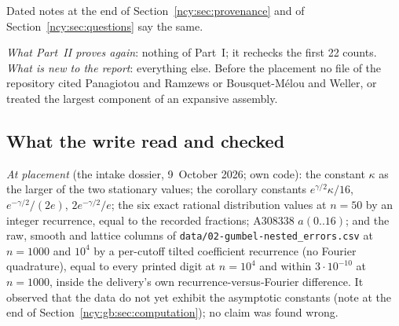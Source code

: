 \documentclass[11pt,letterpaper]{article}
\numberwithin{equation}{section}
\theoremstyle{remark}\newtheorem{remark}[theorem]{Remark}
\newcommand{\file}[1]{\nolinkurl{#1}}
\theoremstyle{definition}\newtheorem{definition}[theorem]{Definition}\theoremstyle{plain}
\begin{document}
Dated notes at the end of Section~\ref{ncy:sec:provenance} and of
Section~\ref{ncy:sec:questions} say the same.

\emph{What Part~II proves again}: nothing of Part~I; it rechecks the first 22
counts. \emph{What is new to the report}: everything else. Before the
placement no file of the repository cited Panagiotou and Ramzews or
Bousquet-M\'elou and Weller, or treated the largest component of an
expansive assembly.

\subsection{What the write read and checked}\label{ncy:gb:sec:checks}

\emph{At placement} (the intake dossier, 9~October 2026; own code): the
constant $\kappa$ as the larger of the two stationary values; the corollary
constants $e^{\gamma/2}\kappa/16$, $e^{-\gamma/2}/(2e)$, $2e^{-\gamma/2}/e$;
the six exact rational distribution values at $n=50$ by an integer
recurrence, equal to the recorded fractions; A308338 $a(0..16)$; and the raw,
smooth and lattice columns of \file{data/02-gumbel-nested_errors.csv} at
$n=1000$ and $10^4$ by a per-cutoff tilted coefficient recurrence (no
Fourier quadrature), equal to every printed digit at $n=10^4$ and within
$3\cdot10^{-10}$ at $n=1000$, inside the delivery's own
recurrence-versus-Fourier difference. It observed that the data do not yet
exhibit the asymptotic constants (note at the end of
Section~\ref{ncy:gb:sec:computation}); no claim was found wrong.
\end{document}
